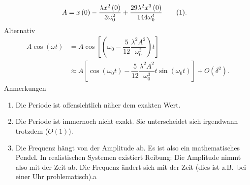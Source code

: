 \documentclass[a4paper,12pt]{article}
\newcommand\inlineeqnowo{{\theequation}} %
\numberwithin{equation}{section}
\begin{document}
\begin{align*} 
        A&=x\left(0\right)-\dfrac{\lambda x^2\left(0\right)}{3\omega _0^2}+\dfrac{29\lambda ^2x^3\left(0\right)}{144\omega _0^4}\stepcounter{equation}\tag{\inlineeqnowo}\label{eq:9.31}
.\end{align*} 
Alternativ
\begin{align*} 
        A\cos \left(\omega t\right)&=A\cos \left[\left(\omega _0-\dfrac{5}{12}\dfrac{\lambda ^2A^2}{\omega _0^3}\right)t\right]\\
                                   &\approx A\left[\cos \left(\omega _0t\right)-\dfrac{5}{12}\dfrac{\lambda ^2A^2}{\omega _0^3}t\sin \left(\omega _0t\right)\right]+O\left(\delta ^2\right)
.\end{align*} 
Anmerkungen
\begin{enumerate}[label=$\circ$]
        \item Die Periode ist offensichtlich näher dem exakten Wert.
        \item Die Periode ist immernoch nicht exakt. Sie unterscheidet sich irgendwann trotzdem ($O\left(1\right)$).
        \item Die Frequenz hängt von der Amplitude ab. Es ist also ein mathematisches Pendel. In realistischen Systemen existiert Reibung: Die Amplitude nimmt also mit der Zeit ab. Die Frequenz ändert sich mit der Zeit (dies ist z.B.\ bei einer Uhr problematisch).a
\end{enumerate}
\end{document}
